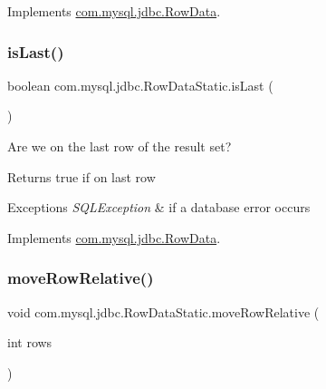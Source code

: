 Implements \mbox{\hyperlink{interfacecom_1_1mysql_1_1jdbc_1_1_row_data_a4bcee2924cecb7f100d887963d6b5b70}{com.\+mysql.\+jdbc.\+Row\+Data}}.

\mbox{\label{classcom_1_1mysql_1_1jdbc_1_1_row_data_static_a2f803e1be38e80c4d1c89cc3a3f32e38}} 
\subsubsection{\texorpdfstring{is\+Last()}{isLast()}}
{\footnotesize\ttfamily boolean com.\+mysql.\+jdbc.\+Row\+Data\+Static.\+is\+Last (\begin{DoxyParamCaption}{ }\end{DoxyParamCaption})}

Are we on the last row of the result set?

\begin{DoxyReturn}{Returns}
true if on last row 
\end{DoxyReturn}

\begin{DoxyExceptions}{Exceptions}
{\em S\+Q\+L\+Exception} & if a database error occurs \\
\hline
\end{DoxyExceptions}


Implements \mbox{\hyperlink{interfacecom_1_1mysql_1_1jdbc_1_1_row_data_a372c70885e7272deb3ad84fefb75eebb}{com.\+mysql.\+jdbc.\+Row\+Data}}.

\mbox{\label{classcom_1_1mysql_1_1jdbc_1_1_row_data_static_ae1af87ce2daba5af9430ee3eaa5086ac}} 
\subsubsection{\texorpdfstring{move\+Row\+Relative()}{moveRowRelative()}}
{\footnotesize\ttfamily void com.\+mysql.\+jdbc.\+Row\+Data\+Static.\+move\+Row\+Relative (\begin{DoxyParamCaption}\item[{int}]{rows }\end{DoxyParamCaption})}

